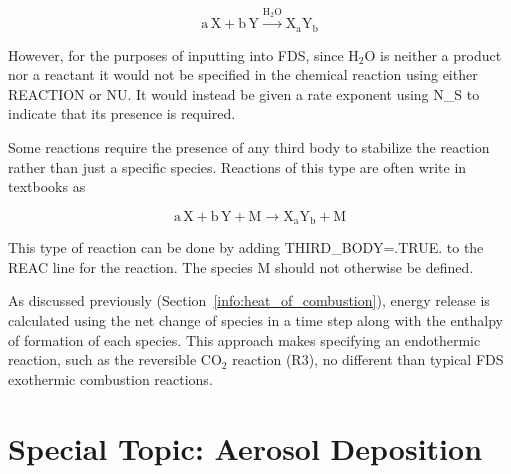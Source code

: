 \documentclass[11pt]{book}
\begin{document}
\begin{equation}\label{eq:inert_1step}
\mathrm{a \, X + b \, Y \overset{H_2O}{\longrightarrow} X_aY_b}
\end{equation}

However, for the purposes of inputting into FDS, since H$_2$O is neither a product nor a reactant it would not be specified in the chemical reaction using either {\ct REACTION} or {\ct NU}.  It would instead be given a rate exponent using {\ct N\_S} to indicate that its presence is required.

Some reactions require the presence of any third body to stabilize the reaction rather than just a specific species.  Reactions of this type are often write in textbooks as

\begin{equation}\label{eq:third_body}
\mathrm{a \, X + b \, Y + M \rightarrow X_aY_b + M }
\end{equation}

This type of reaction can be done by adding {\ct THIRD\_BODY=.TRUE.} to the {\ct REAC} line for the reaction.  The species M should not otherwise be defined.

As discussed previously (Section~\ref{info:heat_of_combustion}), energy release is calculated using the net change of species in a time step along with the enthalpy of formation of each species. This approach makes specifying an endothermic reaction, such as the reversible CO$_2$ reaction (R3), no different than typical FDS exothermic combustion reactions.



\section{Special Topic: Aerosol Deposition}
\label{info:deposition}
\end{document}
